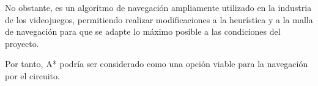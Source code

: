 \begin{itemize}
   No obstante, es un algoritmo de navegación ampliamente utilizado en la industria de los videojuegos, permitiendo realizar modificaciones a la heurística y a la malla de navegación para que se adapte lo máximo posible a las condiciones del proyecto.

   Por tanto, A* podría ser considerado como una opción viable para la navegación por el circuito.

\end{itemize}